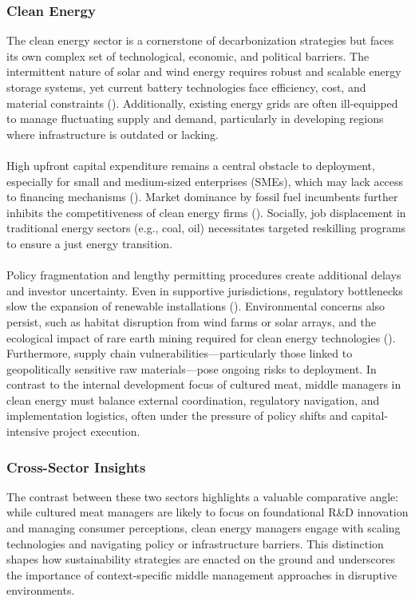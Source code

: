 	\subsubsection{Clean Energy}
	The clean energy sector is a cornerstone of decarbonization strategies but faces its own complex set of technological, economic, and political barriers. The intermittent nature of solar and wind energy requires robust and scalable energy storage systems, yet current battery technologies face efficiency, cost, and material constraints (\textcite{Zhang2016, IEA2021}). Additionally, existing energy grids are often ill-equipped to manage fluctuating supply and demand, particularly in developing regions where infrastructure is outdated or lacking.
	
	\paragraph*{} High upfront capital expenditure remains a central obstacle to deployment, especially for small and medium-sized enterprises (SMEs), which may lack access to financing mechanisms (\textcite{Mngumi2022}). Market dominance by fossil fuel incumbents further inhibits the competitiveness of clean energy firms (\textcite{IRENA2017}). Socially, job displacement in traditional energy sectors (e.g., coal, oil) necessitates targeted reskilling programs to ensure a just energy transition.
	
	\paragraph*{} Policy fragmentation and lengthy permitting procedures create additional delays and investor uncertainty. Even in supportive jurisdictions, regulatory bottlenecks slow the expansion of renewable installations (\textcite{Zhang2016}). Environmental concerns also persist, such as habitat disruption from wind farms or solar arrays, and the ecological impact of rare earth mining required for clean energy technologies (\textcite{IEA2021}). Furthermore, supply chain vulnerabilities—particularly those linked to geopolitically sensitive raw materials—pose ongoing risks to deployment. In contrast to the internal development focus of cultured meat, middle managers in clean energy must balance external coordination, regulatory navigation, and implementation logistics, often under the pressure of policy shifts and capital-intensive project execution.
	
	\subsubsection{Cross-Sector Insights}
	The contrast between these two sectors highlights a valuable comparative angle: while cultured meat managers are likely to focus on foundational R\&D innovation and managing consumer perceptions, clean energy managers engage with scaling technologies and navigating policy or infrastructure barriers. This distinction shapes how sustainability strategies are enacted on the ground and underscores the importance of context-specific middle management approaches in disruptive environments.
	
